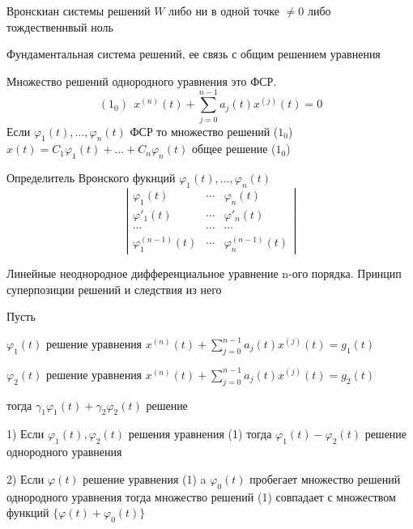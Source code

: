 \begin{block}[Следствие]
  Вронскиан системы решений $W$ либо ни в одной точке $\not= 0$ либо
  тождественнвый ноль
\end{block}

\begin{title}[\Large]
  Фундаментальная система решений, ее связь с общим решением уравнения
\end{title}

\begin{theorem}
  Множество решений однородного уравнения
  это ФСР.
  $$
  (1_0) ~~ x^{(n)}(t) + \sum_{j=0}^{n-1} a_j(t)x^{(j)}(t) = 0
  $$
  Если $\varphi_1(t), \ldots, \varphi_n(t)$ ФСР то множество решений ($1_0$)
  $x(t) = C_1 \varphi_1(t) + \ldots + C_n \varphi_n(t)$ общее решение ($1_0$)
\end{theorem}

\begin{define}
  Определитель Вронского фукнций $\varphi_1(t), \ldots, \varphi_n(t)$
  $$
  \left|
  \begin{array}{ccc}
    \varphi_1(t) & \cdots & \varphi_n(t) \\
    \varphi'_1(t) & \cdots & \varphi'_n(t) \\
    \cdots &
    \cdots &
    \cdots \\
    \varphi_1^{(n-1)}(t) & \cdots & \varphi_n^{(n-1)}(t)
  \end{array}
  \right|
  $$
\end{define}

\begin{title}[\Large]
  Линейные неоднородное дифференциальное уравнение n-ого порядка. Принцип
  суперпозиции решений и следствия из него
\end{title}

\begin{theorem}
  Пусть

  $\varphi_1(t)$ решение уравнения $x^{(n)}(t) +
  \sum_{j=0}^{n-1} a_j(t)x^{(j)}(t) = g_1(t)$

  $\varphi_2(t)$ решение уравнения $x^{(n)}(t) +
  \sum_{j=0}^{n-1} a_j(t)x^{(j)}(t) = g_2(t)$

  тогда $\gamma_1\varphi_1(t) + \gamma_2\varphi_2(t)$ решение
\end{theorem}

\begin{block}[Следствия]
  1) Если $\varphi_1(t), \varphi_2(t)$ решения уравнения (1) тогда
  $\varphi_1(t) - \varphi_2(t)$ решение однородного уравнения

  2) Если $\varphi(t)$ решение уравнения (1) a $\varphi_0(t)$ пробегает
  множество решений однородного уравнения тогда множество решений (1) совпадает
  с множеством функций $\{\varphi(t) + \varphi_0(t)\}$
\end{block}

